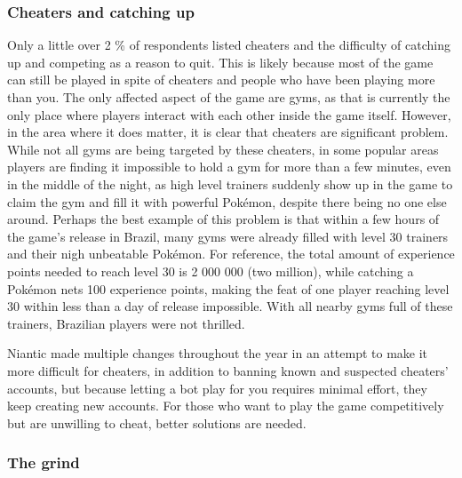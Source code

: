 \subsubsection{Cheaters and catching up}
\label{sec:cheaters-analysis}
Only a little over 2 \% of respondents listed cheaters and the difficulty of catching up and competing as a reason to quit. This is likely because most of the game can still be played in spite of cheaters and people who have been playing more than you. The only affected aspect of the game are gyms, as that is currently the only place where players interact with each other inside the game itself. However, in the area where it does matter, it is clear that cheaters are significant problem. While not all gyms are being targeted by these cheaters, in some popular areas players are finding it impossible to hold a gym for more than a few minutes, even in the middle of the night, as high level trainers suddenly show up in the game to claim the gym and fill it with powerful Pokémon, despite there being no one else around. Perhaps the best example of this problem is that within a few hours of the game's release in Brazil, many gyms were already filled with level 30 trainers and their nigh unbeatable Pokémon. For reference, the total amount of experience points needed to reach level 30 is 2 000 000 (two million), while catching a Pokémon nets 100 experience points, making the feat of one player reaching level 30 within less than a day of release impossible.  With all nearby gyms full of these trainers, Brazilian players were not thrilled.

Niantic made multiple changes throughout the year in an attempt to make it more difficult for cheaters, in addition to banning known and suspected cheaters' accounts, but because letting a bot play for you requires minimal effort, they keep creating new accounts. For those who want to play the game competitively but are unwilling to cheat, better solutions are needed. 

\subsubsection{The grind}


